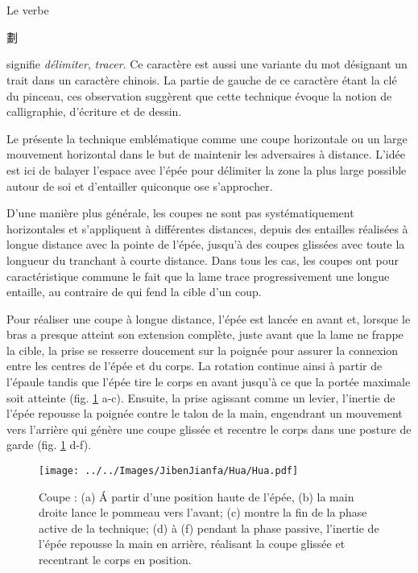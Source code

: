 \section{\Hua}
Le verbe \Hua{} \begin{CJK*}{UTF8}{bsmi}劃\end{CJK*} signifie \textit{délimiter}, \textit{tracer}. Ce caractère est aussi une variante du mot désignant un trait dans un caractère chinois.
La partie de gauche de ce caractère étant la clé du pinceau, ces observation suggèrent que cette technique évoque la notion de calligraphie, d'écriture et de dessin.

Le \Yangjia{} \Michuan{} présente la technique \Hua{} emblématique comme une coupe horizontale ou un large mouvement horizontal dans le but de maintenir les adversaires à distance. L'idée est ici de balayer l'espace avec l'épée pour délimiter la zone la plus large possible autour de soi et d'entailler quiconque ose s'approcher.

D'une manière plus générale, les coupes \Hua{} ne sont pas systématiquement horizontales et s'appliquent à différentes distances, depuis des entailles réalisées à longue distance avec la pointe de l'épée, jusqu'à des coupes glissées avec toute la longueur du tranchant à courte distance. Dans tous les cas, les coupes \Hua{} ont pour caractéristique commune le fait que la lame trace progressivement une longue entaille, au contraire de \Pi{} qui fend la cible d'un coup. 

Pour réaliser une coupe \Hua{} à longue distance, l'épée est lancée en avant et, lorsque le bras a presque atteint son extension complète, juste avant que la lame ne frappe la cible, la prise se resserre doucement sur la poignée pour assurer la connexion entre les centres de l'épée et du corps. La rotation continue ainsi à partir de l'épaule tandis que l'épée tire le corps en avant jusqu'à ce que la portée maximale soit atteinte (fig. \ref{fig:hua_cut} a-c). Ensuite, la prise agissant comme un levier, l'inertie de l'épée repousse la poignée contre le talon de la main, engendrant un mouvement vers l'arrière qui génère une coupe glissée et recentre le corps dans une posture de garde (fig. \ref{fig:hua_cut} d-f). 

\begin{figure}[ht]
\centering
	\texttt{[image: ../../Images/JibenJianfa/Hua/Hua.pdf]}
	\caption[Coupe \Hua{}]{Coupe \Hua{} : (a) \'{A} partir d'une position haute de l'épée, (b) la main droite lance le pommeau vers l'avant; (c) montre la fin de la phase active de la technique; (d) à (f) pendant la phase passive, l'inertie de l'épée repousse la main en arrière, réalisant la coupe glissée et recentrant le corps en position.}
	\label{fig:hua_cut}
\end{figure}

